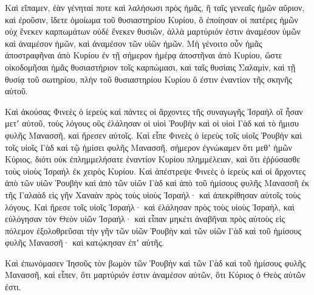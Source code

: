 {Καὶ εἴπαμεν, ἐὰν γένηταί ποτε καὶ λαλήσωσι πρὸς ἡμᾶς, ἢ ταῖς γενεαῖς ἡμῶν αὔριον, καὶ ἐροῦσιν, ἴδετε ὁμοίωμα τοῦ θυσιαστηρίου Κυρίου, ὃ ἐποίησαν οἱ πατέρες ἡμῶν οὐχ ἕνεκεν καρπωμάτων οὐδὲ ἕνεκεν θυσιῶν, ἀλλὰ μαρτύριόν ἐστιν ἀναμέσον ὑμῶν καὶ ἀναμέσον ἡμῶν, καὶ ἀναμέσον τῶν υἱῶν ἡμῶν.
Μὴ γένοιτο οὖν ἡμᾶς ἀποστραφῆναι ἀπὸ Κυρίου ἐν τῇ σήμερον ἡμέρᾳ ἀποστῆναι ἀπὸ Κυρίου, ὥστε οἰκοδομῆσαι ἡμᾶς θυσιαστήριον τοῖς καρπώμασι, καὶ ταῖς θυσίαις Σαλαμὶν, καὶ τῇ θυσίᾳ τοῦ σωτηρίου, πλὴν τοῦ θυσιαστηρίου Κυρίου ὅ ἐστιν ἐναντίον τῆς σκηνῆς αὐτοῦ.
\par }{\PP {}Καὶ ἀκούσας Φινεὲς ὁ ἱερεὺς καὶ πάντες οἱ ἄρχοντες τῆς συναγωγῆς Ἰσραὴλ οἳ ἦσαν μετʼ αὐτοῦ, τοὺς λόγους οὓς ἐλάλησαν οἱ υἱοὶ Ῥουβὴν καὶ οἱ υἱοὶ Γὰδ καὶ τὸ ἥμισυ φυλῆς Μανασσῆ, καὶ ἤρεσεν αὐτοῖς.
Καὶ εἶπε Φινεὲς ὁ ἱερεὺς τοῖς υἱοῖς Ῥουβὴν καὶ τοῖς υἱοῖς Γὰδ καὶ τῷ ἡμίσει φυλῆς Μανασσῆ, σήμερον ἐγνώκαμεν ὅτι μεθʼ ἡμῶν Κύριος, διότι οὐκ ἐπλημμελήσατε ἐναντίον Κυρίου πλημμέλειαν, καὶ ὅτι ἐῤῥύσασθε τοὺς υἱοὺς Ἰσραὴλ ἐκ χειρὸς Κυρίου.
Καὶ ἀπέστρεψε Φινεὲς ὁ ἱερεὺς καὶ οἱ ἄρχοντες ἀπὸ τῶν υἱῶν Ῥουβὴν καὶ ἀπὸ τῶν υἱῶν Γὰδ καὶ ἀπὸ τοῦ ἡμίσους φυλῆς Μανασσῆ ἐκ τῆς Γαλαὰδ εἰς γῆν Χαναὰν πρὸς τοὺς υἱοὺς Ἰσραήλ· καὶ ἀπεκρίθησαν αὐτοῖς τοὺς λόγους.
Καὶ ἤρεσε τοῖς υἱοῖς Ἰσραήλ· καὶ ἐλάλησαν πρὸς τοὺς υἱοὺς Ἰσραὴλ, καὶ εὐλόγησαν τὸν Θεὸν υἱῶν Ἰσραήλ· καὶ εἶπαν μηκέτι ἀναβῆναι πρὸς αὐτοὺς εἰς πόλεμον ἐξολοθρεῦσαι τὴν γῆν τῶν υἱῶν Ῥουβὴν καὶ τῶν υἱῶν Γὰδ καὶ τοῦ ἡμίσους φυλῆς Μανασσῆ· καὶ κατῴκησαν ἐπʼ αὐτῆς.
\par }{\PP {}Καὶ ἐπωνόμασεν Ἰησοῦς τὸν βωμὸν τῶν Ῥουβὴν καὶ τῶν Γὰδ καὶ τοῦ ἡμίσους φυλῆς Μανασσῆ, καὶ εἶπεν, ὅτι μαρτύριόν ἐστιν ἀναμέσον αὐτῶν, ὅτι Κύριος ὁ Θεὸς αὐτῶν ἐστι.

}
